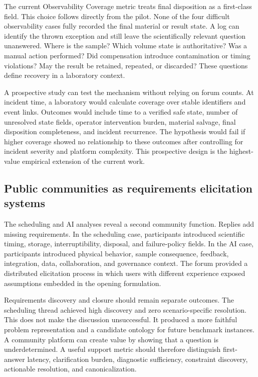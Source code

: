 The current Observability Coverage metric treats final disposition as a first-class field. This choice follows directly from the pilot. None of the four difficult observability cases fully recorded the final material or result state. A log can identify the thrown exception and still leave the scientifically relevant question unanswered. Where is the sample? Which volume state is authoritative? Was a manual action performed? Did compensation introduce contamination or timing violations? May the result be retained, repeated, or discarded? These questions define recovery in a laboratory context.

A prospective study can test the mechanism without relying on forum counts. At incident time, a laboratory would calculate coverage over stable identifiers and event links. Outcomes would include time to a verified safe state, number of unresolved state fields, operator intervention burden, material salvage, final disposition completeness, and incident recurrence. The hypothesis would fail if higher coverage showed no relationship to these outcomes after controlling for incident severity and platform complexity. This prospective design is the highest-value empirical extension of the current work.

\subsection{Public communities as requirements elicitation systems}

The scheduling and AI analyses reveal a second community function. Replies add missing requirements. In the scheduling case, participants introduced scientific timing, storage, interruptibility, disposal, and failure-policy fields. In the AI case, participants introduced physical behavior, sample consequence, feedback, integration, data, collaboration, and governance context. The forum provided a distributed elicitation process in which users with different experience exposed assumptions embedded in the opening formulation.

Requirements discovery and closure should remain separate outcomes. The scheduling thread achieved high discovery and zero scenario-specific resolution. This does not make the discussion unsuccessful. It produced a more faithful problem representation and a candidate ontology for future benchmark instances. A community platform can create value by showing that a question is underdetermined. A useful support metric should therefore distinguish first-answer latency, clarification burden, diagnostic sufficiency, constraint discovery, actionable resolution, and canonicalization.

